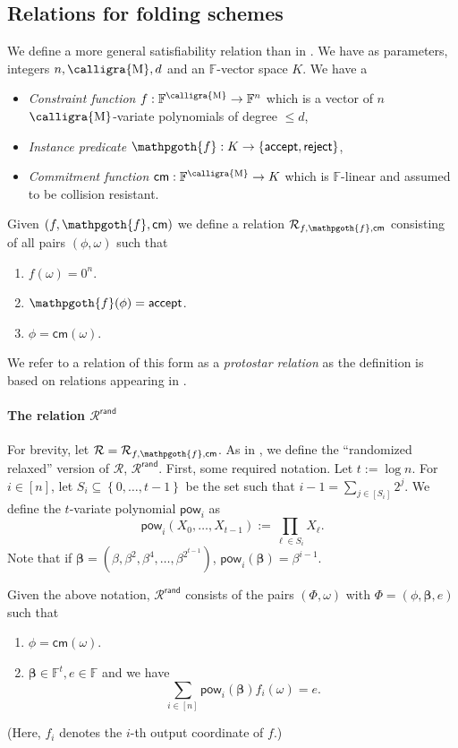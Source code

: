 \documentclass[11pt]{article} %
\newcommand{\F}{\ensuremath{\mathbb F}\xspace}
\newcommand{\cm}{\ensuremath{\mathsf{cm}}\xspace}
\newcommand{\rej}{\ensuremath{\mathsf{reject}}\xspace}
\newcommand{\accept}{\ensuremath{\mathsf{accept}}\xspace}
\newcommand{\defeq}{:=}
\newcommand{\inst}{\ensuremath{\phi}\xspace}
\newcommand{\wit}{\ensuremath{\mathsf{\omega}}\xspace}
\newcommand{\rel}{\ensuremath{\mathcal{R}}\xspace}
\newcommand{\relrand}{\ensuremath{\mathcal{R^{\mathsf{rand}}}}\xspace}
\newcommand{\set}[1]{\ensuremath{\left\{#1\right\}}\xspace}
\newcommand{\sumi}[1]{\sum_{i\in[#1]}}
\newcommand{\sumj}[1]{\sum_{j\in[#1]}}
\newcommand{\betaa}{\ensuremath{\mathbf{\boldsymbol{\beta}}}\xspace}
\newcommand{\insttbase}{\ensuremath{\Phi}\xspace}
\newcommand{\pow}{\ensuremath{\mathsf{pow}}\xspace}
\newcommand{\predinst}{\ensuremath{\mathpgoth{f}}\xspace}
\newcommand{\calligmath}[1]{\ensuremath{\text{\calligra{#1}}}\xspace}
\newcommand{\M}{\calligmath{M}}
\begin{document}
\subsection{Relations for folding schemes}
We define a more general satisfiability relation than in \cite{protostar, protogalaxy}.
We have as parameters, integers $n,\M,d$ and an $\F$-vector space $K$.
We have a
\begin{itemize}
 \item \emph{Constraint function} $f:\F^\M\to \F^n$ which is a vector of $n$ $\M$-variate polynomials of degree $\leq d$,
\item \emph{Instance predicate} $\predinst:K \to \set{\accept,\rej}$,
\item \emph{Commitment function} $\cm:\F^\M \to K$ which is $\F$-linear and assumed
to be collision resistant.
\end{itemize}

Given $(f,\predinst,\cm)$ we define a relation $\rel_{f,\predinst,\cm}$ consisting of all pairs
$(\inst,\wit)$ such that
\begin{enumerate}
 \item $f(\wit)=0^n$.
 \item $\predinst(\inst)=\accept$.
 \item $\inst=\cm(\wit)$.
\end{enumerate}
We refer to a relation of this form as a \emph{protostar relation} as the definition is based on relations appearing in \cite{protostar}.
\paragraph{The relation \relrand}
 For brevity, let $\rel=\rel_{f,\predinst,\cm}$.
  As in \cite{protogalaxy}, we define the ``randomized relaxed'' version of \rel, \relrand. First, some required notation.
 Let $t\defeq \log n$. For $i\in [n]$, let $S_i\subseteq \set{0,\ldots,t-1}$ be the set such that $i-1=\sumj{S_i}2^j$. We define the $t$-variate polynomial $\pow_i$ as
 \[\pow_i(X_0,\ldots,X_{t-1}) \defeq \prod_{\ell\in S_i} X_\ell.\]
 Note that if $\betaa=(\beta,\beta^2,\beta^4,\ldots,\beta^{2^{t-1}})$, $\pow_i(\betaa)=\beta^{i-1}$.

  Given the above notation, \relrand consists of the pairs $(\insttbase,\wit)$ with $\insttbase=(\inst,\betaa,e)$ such that
 \begin{enumerate}
  \item $\inst=\cm(\wit)$.
  \item $\betaa\in \F^t, e\in \F$ and we have
  \[\sumi{n}\pow_i(\betaa) f_i(\wit) = e.\]
 \end{enumerate}
(Here, $f_i$ denotes the $i$-th output coordinate of $f$.)
\end{document}
